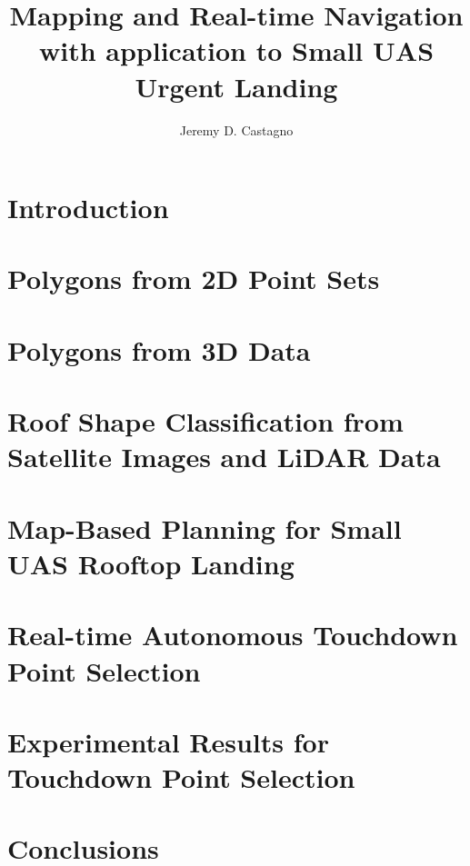 \documentclass[thesis]{./style/thesis-umich}
\title{Mapping and Real-time Navigation \\ with application to Small UAS Urgent Landing}
\author{Jeremy D. Castagno}
\theoremstyle{remark}
\begin{document}

\chapter{Introduction}
 \label{ch:introduction}
 

 
\chapter{Polygons from 2D Point Sets}
 \label{ch:polylidar}
 
 
\chapter{Polygons from 3D Data}
 \label{ch:polylidar3d}
 
 
\chapter{Roof Shape Classification from Satellite Images and LiDAR Data  }
 \label{ch:roofshape}
 
 
\chapter{Map-Based Planning for Small UAS Rooftop Landing }
 \label{ch:maplanding}
 
 
\chapter{Real-time Autonomous Touchdown Point Selection}
 \label{ch:landingsim}
 
 
\chapter{Experimental Results for Touchdown Point Selection}
 \label{ch:experiments}
 
 
\chapter{Conclusions}
 \label{ch:conclusions}
 


%  






\end{document}
